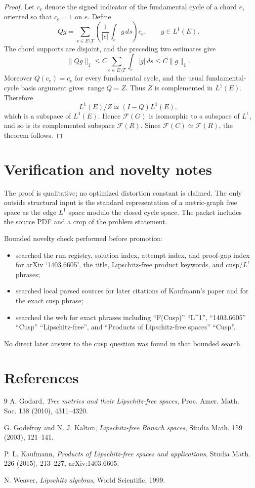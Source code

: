 \documentclass[11pt]{article}
\newcommand{\F}{\mathcal F}
\begin{document}
\begin{proof}
Let \(c_e\) denote the signed indicator of the fundamental cycle of a chord \(e\), oriented so that \(c_e=1\) on \(e\).  Define
\[
 Qg=\sum_{e\in E\setminus T}\left(\frac1{|e|}\int_e g\,ds\right)c_e,\qquad g\in L^1(E).
\]
The chord supports are disjoint, and the preceding two estimates give
\[
 \|Qg\|_1\leq C\sum_{e\in E\setminus T}\int_e |g|\,ds\leq C\|g\|_1.
\]
Moreover \(Q(c_e)=c_e\) for every fundamental cycle, and the usual fundamental-cycle basis argument gives \(\operatorname{range} Q=Z\).  Thus \(Z\) is complemented in \(L^1(E)\).  Therefore
\[
 L^1(E)/Z \simeq (I-Q)L^1(E),
\]
which is a subspace of \(L^1(E)\).  Hence \(\F(G)\) is isomorphic to a subspace of \(L^1\), and so is its complemented subspace \(\F(R)\).  Since \(\F(C)\simeq\F(R)\), the theorem follows.
\end{proof}

\section{Verification and novelty notes}

The proof is qualitative; no optimized distortion constant is claimed.  The only outside structural input is the standard representation of a metric-graph free space as the edge \(L^1\) space modulo the closed cycle space.  The packet includes the source PDF and a crop of the problem statement.

Bounded novelty check performed before promotion:
\begin{itemize}
\item searched the run registry, solution index, attempt index, and proof-gap index for arXiv `1403.6605', the title, Lipschitz-free product keywords, and cusp/\(L^1\) phrases;
\item searched local parsed sources for later citations of Kaufmann's paper and for the exact cusp phrase;
\item searched the web for exact phrases including ``F(Cusp)'' ``L\^{}1'', ``1403.6605'' ``Cusp'' ``Lipschitz-free'', and ``Products of Lipschitz-free spaces'' ``Cusp''.
\end{itemize}
No direct later answer to the cusp question was found in that bounded search.

\section{References}

\begin{thebibliography}{9}
A. Godard, \emph{Tree metrics and their Lipschitz-free spaces}, Proc. Amer. Math. Soc. 138 (2010), 4311--4320.

G. Godefroy and N. J. Kalton, \emph{Lipschitz-free Banach spaces}, Studia Math. 159 (2003), 121--141.

P. L. Kaufmann, \emph{Products of Lipschitz-free spaces and applications}, Studia Math. 226 (2015), 213--227, arXiv:1403.6605.

N. Weaver, \emph{Lipschitz algebras}, World Scientific, 1999.
\end{thebibliography}
\end{document}
